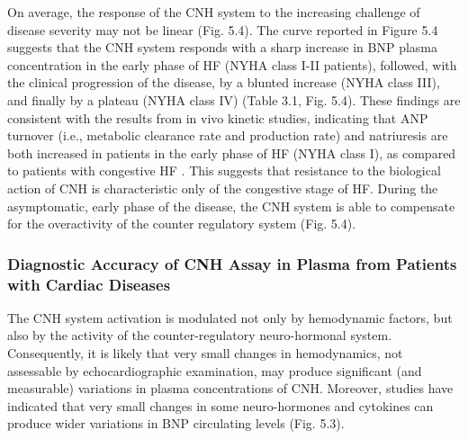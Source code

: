 \documentclass[14pt,a4paper,onecolumn]{extarticle}
\begin{document}
On average, the response of the CNH system to the increasing challenge of disease severity may not be linear (Fig. 5.4). The curve reported in Figure 5.4 suggests that the CNH system responds with a sharp increase in BNP plasma concentration in the early phase of HF (NYHA class I-II patients), followed, with the clinical progression of the disease, by a blunted increase (NYHA class III), and finally by a plateau (NYHA class IV) (Table 3.1, Fig. 5.4). These findings are consistent with the results from in vivo kinetic studies, indicating that ANP turnover (i.e., metabolic clearance rate and production rate) and natriuresis are both increased in patients in the early phase of HF (NYHA class I), as compared to patients with congestive HF \citep{bib327} \citep{bib333}. This suggests that resistance to the biological action of CNH is characteristic only of the congestive stage of HF. During the asymptomatic, early phase of the disease, the CNH system is able to compensate for the overactivity of the counter regulatory system (Fig. 5.4).


\subsubsection{ Diagnostic Accuracy of CNH Assay in Plasma from Patients with Cardiac Diseases}

The CNH system activation is modulated not only by hemodynamic factors, but also by the activity of the counter-regulatory neuro-hormonal system.%
Consequently, it is likely that very small changes in hemodynamics, not assessable by echocardiographic examination, may produce significant (and measurable) variations in plasma concentrations of CNH. Moreover, studies have indicated that very small changes in some neuro-hormones and cytokines can produce wider variations in BNP circulating levels \citep{bib360} (Fig. 5.3).
\end{document}

